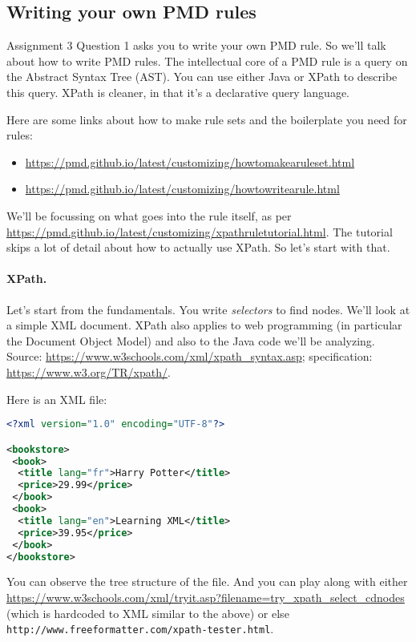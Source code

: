 \documentclass[11pt]{article}
\begin{document}
\subsection*{Writing your own PMD rules} 
Assignment 3 Question 1 asks you to write your own PMD rule. So we'll talk about
how to write PMD rules. The intellectual core of a PMD rule is 
a query on the Abstract Syntax Tree (AST). You can use either Java or XPath to describe
this query. XPath is cleaner, in that it's a declarative query language.

Here are some links about how to make rule sets and the boilerplate you need for rules:
\begin{itemize}[noitemsep]
\item \url{https://pmd.github.io/latest/customizing/howtomakearuleset.html}
\item \url{https://pmd.github.io/latest/customizing/howtowritearule.html}
\end{itemize}

We'll be focussing on what goes into the rule itself, as per
\url{https://pmd.github.io/latest/customizing/xpathruletutorial.html}.
The tutorial skips a lot of detail about how to actually use XPath. So let's start
with that.

\paragraph{XPath.} Let's start from the fundamentals. You write 
\emph{selectors} to find nodes. We'll look at a simple XML document.
XPath also applies to web programming (in particular the Document
Object Model) and also to the Java code we'll be analyzing. Source:
\url{https://www.w3schools.com/xml/xpath_syntax.asp}; specification:
\url{https://www.w3.org/TR/xpath/}.

\newpage
Here is an XML file:
\begin{lstlisting}[language=XML]
<?xml version="1.0" encoding="UTF-8"?>

<bookstore>
 <book>
  <title lang="fr">Harry Potter</title>
  <price>29.99</price>
 </book>
 <book>
  <title lang="en">Learning XML</title>
  <price>39.95</price>
 </book>
</bookstore>
\end{lstlisting}
You can observe the tree structure of the file. And you can play along
with either
\url{https://www.w3schools.com/xml/tryit.asp?filename=try_xpath_select_cdnodes}
(which is hardcoded to XML similar to the above) or else {\tt
  http://www.freeformatter.com/xpath-tester.html}.
\end{document}

